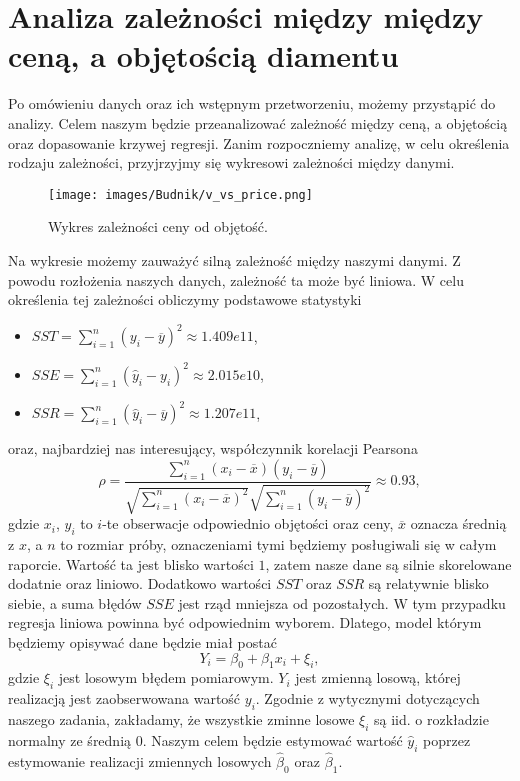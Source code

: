 \documentclass[12pt]{article}
\theoremstyle{exer}
\begin{document}
	\section{Analiza zależności między między ceną, a objętością diamentu}
	Po omówieniu danych oraz ich wstępnym przetworzeniu, możemy przystąpić do analizy. Celem naszym będzie przeanalizować zależność między ceną, a objętością oraz dopasowanie krzywej regresji. Zanim rozpoczniemy analizę, w celu określenia rodzaju zależności, przyjrzyjmy się wykresowi zależności między danymi. %
	\begin{figure}[H]\label{fig:v_vs_price}\centering
		\texttt{[image: images/Budnik/v\_vs\_price.png]}\caption{Wykres zależności ceny od objętość.}
	\end{figure}
	\noindent Na wykresie możemy zauważyć silną zależność między naszymi danymi. Z powodu rozłożenia naszych danych, zależność ta może być liniowa. W celu określenia tej zależności obliczymy podstawowe statystyki
	\begin{itemize}
		\item $SST=\sum_{i=1}^n(y_i-\overline{y})^2\approx1.409e11$,
		\item $SSE=\sum_{i=1}^n(\hat y_i-y_i)^2\approx2.015e10$,
		\item $SSR=\sum_{i=1}^n(\hat y_i-\overline{y})^2\approx1.207e11$,
	\end{itemize}
	oraz, najbardziej nas interesujący, współczynnik korelacji Pearsona
	\begin{equation}
		\rho=\frac{\sum_{i=1}^n\left(x_i-\overline{x}\right)\left(y_i-\overline{y}\right)}
		{\sqrt{\sum_{i=1}^n\left(x_i-\overline{x}\right)^2}\sqrt{\sum_{i=1}^n\left(y_i-\overline{y}\right)^2}}\approx0.93,
	\end{equation}
	gdzie $x_i$, $y_i$ to $i$-te obserwacje odpowiednio objętości oraz ceny, $\overline{x}$ oznacza średnią z $x$, a $n$ to rozmiar próby, oznaczeniami tymi będziemy posługiwali się w całym raporcie. Wartość ta jest blisko wartości $1$, zatem nasze dane są silnie skorelowane dodatnie oraz liniowo. Dodatkowo wartości $SST$ oraz $SSR$ są relatywnie blisko siebie, a suma błędów $SSE$ jest rząd mniejsza od pozostałych. W tym przypadku regresja liniowa powinna być odpowiednim wyborem. Dlatego, model którym będziemy opisywać dane będzie miał postać
	\begin{equation}\label{eq:reg}
		Y_i=\beta_0+\beta_1x_i+\xi_i,
	\end{equation}
	gdzie $\xi_i$ jest losowym błędem pomiarowym. $Y_i$ jest zmienną losową, której realizacją jest zaobserwowana wartość $y_i$. Zgodnie z wytycznymi dotyczących naszego zadania, zakładamy, że wszystkie zminne losowe $\xi_i$ są iid. o rozkładzie normalny ze średnią 0. Naszym celem będzie estymować wartość $\hat y_i$ poprzez estymowanie realizacji zmiennych losowych $\hat \beta_0$ oraz $\hat\beta_1$.
\end{document}
